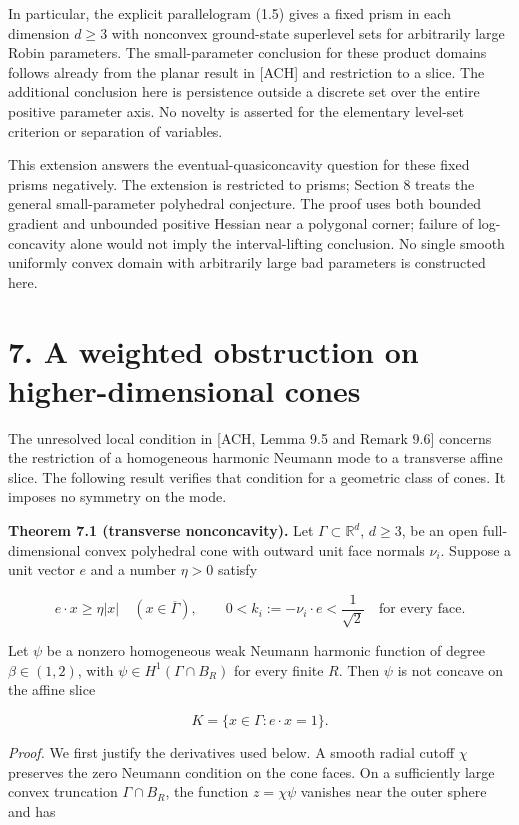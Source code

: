 \documentclass[11pt]{article}
\begin{document}
In particular, the explicit parallelogram (1.5) gives a fixed prism in
each dimension \(d\ge3\) with nonconvex ground-state superlevel sets for
arbitrarily large Robin parameters. The small-parameter conclusion for
these product domains follows already from the planar result in
{[}ACH{]} and restriction to a slice. The additional conclusion here is
persistence outside a discrete set over the entire positive parameter
axis. No novelty is asserted for the elementary level-set criterion or
separation of variables.

This extension answers the eventual-quasiconcavity question for these
fixed prisms negatively. The extension is restricted to prisms; Section
8 treats the general small-parameter polyhedral conjecture. The proof
uses both bounded gradient and unbounded positive Hessian near a
polygonal corner; failure of log-concavity alone would not imply the
interval-lifting conclusion. No single smooth uniformly convex domain
with arbitrarily large bad parameters is constructed here.

\section{7. A weighted obstruction on higher-dimensional
cones}\label{a-weighted-obstruction-on-higher-dimensional-cones}

The unresolved local condition in {[}ACH, Lemma 9.5 and Remark 9.6{]}
concerns the restriction of a homogeneous harmonic Neumann mode to a
transverse affine slice. The following result verifies that condition
for a geometric class of cones. It imposes no symmetry on the mode.

\textbf{Theorem 7.1 (transverse nonconcavity).} Let
\(\Gamma\subset\mathbb R^d\), \(d\ge3\), be an open full-dimensional
convex polyhedral cone with outward unit face normals \(\nu_i\). Suppose
a unit vector \(e\) and a number \(\eta>0\) satisfy

\[
e\cdot x\ge\eta|x|\quad(x\in\overline\Gamma),
\qquad 0<k_i:=-\nu_i\cdot e<\frac1{\sqrt2}
\quad\text{for every face}.
\tag{7.1}
\]

Let \(\psi\) be a nonzero homogeneous weak Neumann harmonic function of
degree \(\beta\in(1,2)\), with \(\psi\in H^1(\Gamma\cap B_R)\) for every
finite \(R\). Then \(\psi\) is not concave on the affine slice

\[
K=\{x\in\Gamma:e\cdot x=1\}.
\tag{7.2}
\]

\emph{Proof.} We first justify the derivatives used below. A smooth
radial cutoff \(\chi\) preserves the zero Neumann condition on the cone
faces. On a sufficiently large convex truncation \(\Gamma\cap B_R\), the
function \(z=\chi\psi\) vanishes near the outer sphere and has
\end{document}

